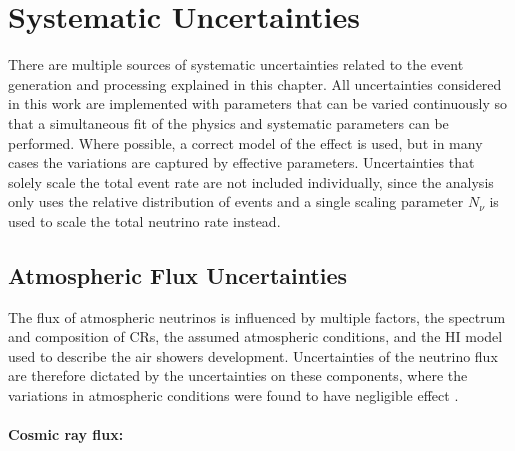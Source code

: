\section{Systematic Uncertainties} 


There are multiple sources of systematic uncertainties related to the event generation and processing explained in this chapter. 
All uncertainties considered in this work are implemented with parameters that can be varied continuously so that a simultaneous fit of the physics and systematic parameters can be performed. Where possible, a correct model of the effect is used, but in many cases the variations are captured by effective parameters. Uncertainties that solely scale the total event rate are not included individually, since the analysis only uses the relative distribution of events and a single scaling parameter $N_{\nu}$ is used to scale the total neutrino rate instead.


\subsection{Atmospheric Flux Uncertainties} 

The flux of atmospheric neutrinos is influenced by multiple factors, the spectrum and composition of CRs, the assumed atmospheric conditions, and the HI model used to describe the air showers development. Uncertainties of the neutrino flux are therefore dictated by the uncertainties on these components, where the variations in atmospheric conditions were found to have negligible effect .


\paragraph{Cosmic ray flux:}

